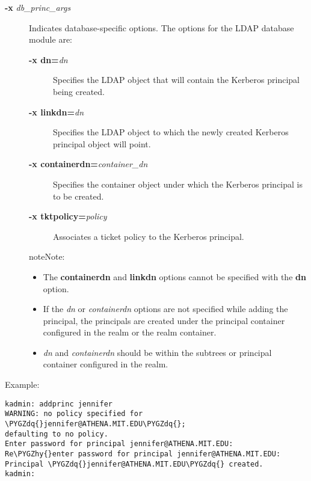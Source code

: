 \documentclass[letterpaper,10pt,english]{sphinxmanual}
\def\PYGZhy{\char`\-}
\def\PYGZdq{\char`\"}
\begin{document}
\begin{description}
\item[{\textbf{-x} \emph{db\_princ\_args}}] \leavevmode
Indicates database-specific options.  The options for the LDAP
database module are:
\begin{description}
\item[{\textbf{-x dn=}\emph{dn}}] \leavevmode
Specifies the LDAP object that will contain the Kerberos
principal being created.

\item[{\textbf{-x linkdn=}\emph{dn}}] \leavevmode
Specifies the LDAP object to which the newly created Kerberos
principal object will point.

\item[{\textbf{-x containerdn=}\emph{container\_dn}}] \leavevmode
Specifies the container object under which the Kerberos
principal is to be created.

\item[{\textbf{-x tktpolicy=}\emph{policy}}] \leavevmode
Associates a ticket policy to the Kerberos principal.

\end{description}

\begin{notice}{note}{Note:}\begin{itemize}
\item {} 
The \textbf{containerdn} and \textbf{linkdn} options cannot be
specified with the \textbf{dn} option.

\item {} 
If the \emph{dn} or \emph{containerdn} options are not specified while
adding the principal, the principals are created under the
principal container configured in the realm or the realm
container.

\item {} 
\emph{dn} and \emph{containerdn} should be within the subtrees or
principal container configured in the realm.

\end{itemize}
\end{notice}

\end{description}

Example:

\begin{Verbatim}[commandchars=\\\{\}]
kadmin: addprinc jennifer
WARNING: no policy specified for \PYGZdq{}jennifer@ATHENA.MIT.EDU\PYGZdq{};
defaulting to no policy.
Enter password for principal jennifer@ATHENA.MIT.EDU:
Re\PYGZhy{}enter password for principal jennifer@ATHENA.MIT.EDU:
Principal \PYGZdq{}jennifer@ATHENA.MIT.EDU\PYGZdq{} created.
kadmin:
\end{Verbatim}
\label{admin/admin_commands/kadmin_local:add-principal-end}
\end{document}
